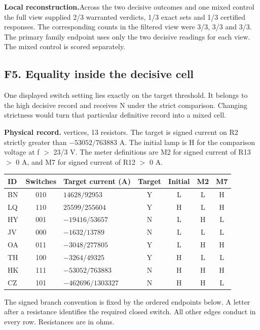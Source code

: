 \documentclass[12pt,letterpaper]{article}
\newcommand{\dossier}[2]{\clearpage\subsection*{#1}\phantomsection\label{#2}}
\newcommand{\reading}[2]{\par\smallskip\textsf{\color{accent}\bfseries #1}\enspace #2\par}
\begin{document}
\reading{Local reconstruction.}{Across the two decisive outcomes and one mixed control the full view supplied 2/3 warranted verdicts, 1/3 exact sets and 1/3 certified responses. The corresponding counts in the filtered view were 3/3, 3/3 and 3/3. The primary family endpoint uses only the two decisive readings for each view. The mixed control is scored separately.}

\dossier{F5. Equality inside the decisive cell}{dsF5}

One displayed switch setting lies exactly on the target threshold. It belongs to the high decisive record and receives N under the strict comparison. Changing strictness would turn that particular definitive record into a mixed cell.

\reading{Physical record.}{8 vertices, 13 resistors. The target is signed current on R2 strictly greater than $-53052/763883$ A. The initial lamp is H for the comparison voltage at f $>$ 23/3 V. The meter definitions are M2 for signed current of R13 $>$ 0 A, and M7 for signed current of R12 $>$ 0 A.}

\begin{center}{\small\setlength{\tabcolsep}{4pt}\begin{tabularx}{\linewidth}{@{}lcYcccc@{}}\toprule
ID & Switches & Target current (A) & Target & Initial & M2 & M7\\ \midrule
BN & 010 & $14628/92953$ & Y & L & L & H\\
LQ & 110 & $25599/255604$ & Y & H & L & H\\
HY & 001 & $-19416/53657$ & N & L & H & L\\
JV & 000 & $-1632/13789$ & N & L & L & L\\
OA & 011 & $-3048/277805$ & Y & L & H & H\\
TH & 100 & $-3264/49325$ & Y & H & L & L\\
HK & 111 & $-53052/763883$ & N & H & H & H\\
CZ & 101 & $-462696/1303327$ & N & H & H & L\\ \bottomrule\end{tabularx}}
\end{center}

The signed branch convention is fixed by the ordered endpoints below. A letter after a resistance identifies the required closed switch. All other edges conduct in every row. Resistances are in ohms.
\end{document}
